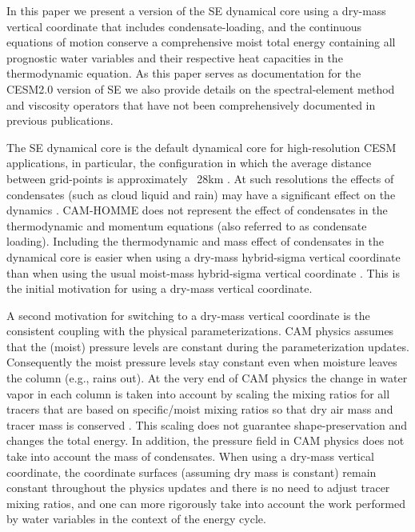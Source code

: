 \documentclass{agujournal}
\begin{document}
{In this paper we present a version of the SE dynamical core using a dry-mass vertical coordinate that includes condensate-loading, and the continuous equations of motion conserve a comprehensive moist total energy containing all prognostic water variables and their respective heat capacities in the thermodynamic equation. As this paper serves as documentation for the CESM2.0 version of SE we also provide details on the spectral-element method and viscosity operators that have not been comprehensively documented in previous publications. 

The SE dynamical core is the default dynamical core for high-resolution CESM applications, in particular, the configuration in which the average distance between grid-points is approximately ~28km \citep{BetAl2016CC}. At such resolutions the effects of condensates (such as cloud liquid and rain) may have a significant effect on the dynamics \citep{BLDT2012GRL}. CAM-HOMME does not represent the effect of condensates in the thermodynamic and momentum equations (also referred to as condensate loading). Including the thermodynamic and mass effect of condensates in the dynamical core is easier when using a dry-mass hybrid-sigma vertical coordinate than when using the usual moist-mass hybrid-sigma vertical coordinate \citep[e.g., ][]{SB1981MWR}. This is the initial motivation for using a dry-mass vertical coordinate.

A second motivation for switching to a dry-mass vertical coordinate is the consistent coupling with the physical parameterizations. CAM physics assumes that the (moist) pressure levels are constant during the parameterization updates. Consequently the moist pressure levels stay constant even when moisture leaves the column (e.g., rains out). At the very end of CAM physics the change in water  vapor in each column is taken into account by scaling the mixing ratios for all tracers that are based on specific/moist mixing ratios so that dry air mass and tracer mass is conserved \citep[see Section 3.1.6 in ][]{CAM5}. This scaling does not guarantee shape-preservation and changes the total energy. In addition, the pressure field in CAM physics does not take into account the mass of condensates. When using a dry-mass vertical coordinate, the coordinate surfaces (assuming dry mass is constant) remain constant throughout the physics updates and there is no need to adjust tracer mixing ratios, and one can more rigorously take into account the work performed by water variables in the context of the energy cycle.

}
\end{document}
